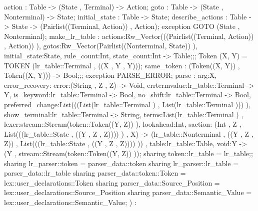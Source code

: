 {{{{                                        action : Table -> (State , Terminal) -> Action;
                                        goto : Table -> (State , Nonterminal) -> State;
                                        initial_state : Table -> State;
                                        describe_actions : Table -> State -> (Pairlist((Terminal, Action)) , Action);
                                        exception GOTO (State , Nonterminal);
                                            make_lr_table :
                                                    {actions:Rw_Vector(((Pairlist((Terminal, Action)) , Action)) ),
                                                    gotos:Rw_Vector(Pairlist((Nonterminal, State)) ), initial_state:State, rule_count:Int,
                                                    state_count:Int}
                                                ->
                                                Table;};;
                            Token (X, Y) = TOKEN (lr_table::Terminal , ((X , Y , Y)));
                            same_token : (Token((X, Y)) , Token((X, Y))) -> Bool;};;
                exception PARSE_ERROR;
                    parse : {arg:X,
                            error_recovery:
                                {error:(String , Z , Z) -> Void, errtermvalue:lr_table::Terminal -> Y,
                                is_keyword:lr_table::Terminal -> Bool, no_shift:lr_table::Terminal -> Bool,
                                preferred_change:List(((List(lr_table::Terminal ) , List(lr_table::Terminal ))) ),
                                show_terminal:lr_table::Terminal -> String, terms:List(lr_table::Terminal )}
                            , lexer:stream::Stream(token::Token((Y, Z)) ), lookahead:Int,
                            saction:
                            (Int , Z , List(((lr_table::State , ((Y , Z , Z)))) ) , X)
                            ->
                            (lr_table::Nonterminal , ((Y , Z , Z)) , List(((lr_table::State , ((Y , Z , Z)))) ))
                            , table:lr_table::Table, void:Y}
                        ->
                        (Y , stream::Stream(token::Token((Y, Z)) ));
            sharing token::lr_table = lr_table};;
    sharing lr_parser::token = parser_data::token
    sharing lr_parser::lr_table = parser_data::lr_table
    sharing parser_data::token::Token = lex::user_declarations::Token
    sharing parser_data::Source_Position = lex::user_declarations::Source_Position
    sharing parser_data::Semantic_Value = lex::user_declarations::Semantic_Value};
)
:
